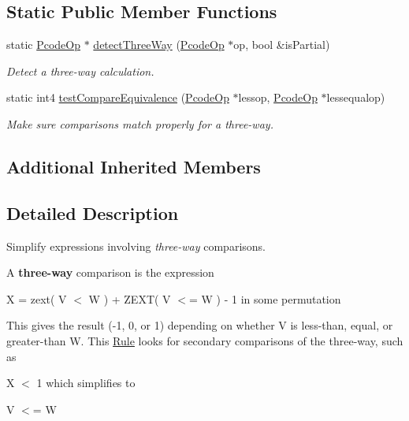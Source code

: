 \subsection*{Static Public Member Functions}
\begin{DoxyCompactItemize}
\item 
static \mbox{\hyperlink{class_pcode_op}{Pcode\+Op}} $\ast$ \mbox{\hyperlink{class_rule_three_way_compare_a7f9059f988deedd2d2b13697e4dac1c3}{detect\+Three\+Way}} (\mbox{\hyperlink{class_pcode_op}{Pcode\+Op}} $\ast$op, bool \&is\+Partial)
\begin{DoxyCompactList}\small\item\em Detect a three-\/way calculation. \end{DoxyCompactList}\item 
static int4 \mbox{\hyperlink{class_rule_three_way_compare_a247d3ecba480bc52cf0240e5932c5e6f}{test\+Compare\+Equivalence}} (\mbox{\hyperlink{class_pcode_op}{Pcode\+Op}} $\ast$lessop, \mbox{\hyperlink{class_pcode_op}{Pcode\+Op}} $\ast$lessequalop)
\begin{DoxyCompactList}\small\item\em Make sure comparisons match properly for a three-\/way. \end{DoxyCompactList}\end{DoxyCompactItemize}
\subsection*{Additional Inherited Members}


\subsection{Detailed Description}
Simplify expressions involving {\itshape three-\/way} comparisons. 

A {\bfseries{three-\/way}} comparison is the expression
\begin{DoxyItemize}
\item {\ttfamily X = zext( V $<$ W ) + Z\+E\+XT( V $<$= W ) -\/ 1} in some permutation
\end{DoxyItemize}

This gives the result (-\/1, 0, or 1) depending on whether V is less-\/than, equal, or greater-\/than W. This \mbox{\hyperlink{class_rule}{Rule}} looks for secondary comparisons of the three-\/way, such as
\begin{DoxyItemize}
\item {\ttfamily X $<$ 1} which simplifies to
\item {\ttfamily V $<$= W} 
\end{DoxyItemize}

